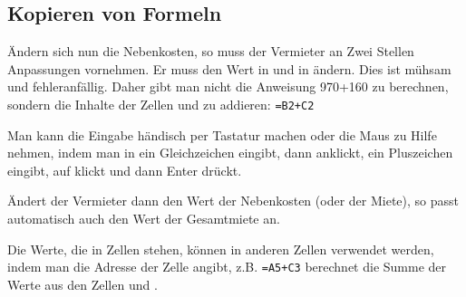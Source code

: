 \subsection{Kopieren von Formeln}
\begin{minipage}{\textwidth}
\end{minipage}

\medskip

Ändern sich nun die Nebenkosten, so muss der Vermieter an Zwei Stellen Anpassungen vornehmen. Er muss den Wert in  und in  ändern. Dies ist mühsam und fehleranfällig. Daher gibt man \Calc nicht die Anweisung 970+160 zu berechnen, sondern die Inhalte der Zellen  und  zu addieren: \lstinline|=B2+C2|

Man kann die Eingabe händisch per Tastatur machen oder die Maus zu Hilfe nehmen, indem man in  ein Gleichzeichen eingibt, dann  anklickt, ein Pluszeichen eingibt, auf  klickt und dann Enter drückt.

Ändert der Vermieter dann den Wert der Nebenkosten (oder der Miete), so passt \Calc automatisch auch den Wert der Gesamtmiete an.
\begin{tcolorbox}[title=Adressierung]
    Die Werte, die in Zellen stehen, können in anderen Zellen verwendet werden, indem man die Adresse der Zelle angibt, z.B. \lstinline|=A5+C3| berechnet die Summe der Werte aus den Zellen  und .
\end{tcolorbox}

